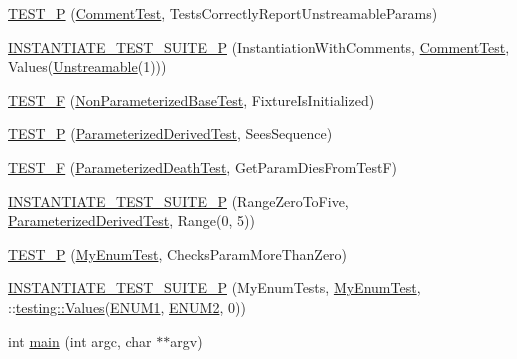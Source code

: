 \begin{DoxyCompactItemize}
\item 
\mbox{\hyperlink{googletest-master_2googletest_2test_2googletest-param-test-test_8cc_a5c5935ee04b0f74f29114ed7e1fa2315}{T\+E\+S\+T\+\_\+P}} (\mbox{\hyperlink{class_comment_test}{Comment\+Test}}, Tests\+Correctly\+Report\+Unstreamable\+Params)
\item 
\mbox{\hyperlink{googletest-master_2googletest_2test_2googletest-param-test-test_8cc_ab4ce7793d1d1d75035b8af30c3548a42}{I\+N\+S\+T\+A\+N\+T\+I\+A\+T\+E\+\_\+\+T\+E\+S\+T\+\_\+\+S\+U\+I\+T\+E\+\_\+P}} (Instantiation\+With\+Comments, \mbox{\hyperlink{class_comment_test}{Comment\+Test}}, Values(\mbox{\hyperlink{class_unstreamable}{Unstreamable}}(1)))
\item 
\mbox{\hyperlink{googletest-master_2googletest_2test_2googletest-param-test-test_8cc_af8865fa8411285bd2492b5105f35a7de}{T\+E\+S\+T\+\_\+F}} (\mbox{\hyperlink{class_non_parameterized_base_test}{Non\+Parameterized\+Base\+Test}}, Fixture\+Is\+Initialized)
\item 
\mbox{\hyperlink{googletest-master_2googletest_2test_2googletest-param-test-test_8cc_a92492aa8cc7fda6eb6438c6f7c74e478}{T\+E\+S\+T\+\_\+P}} (\mbox{\hyperlink{class_parameterized_derived_test}{Parameterized\+Derived\+Test}}, Sees\+Sequence)
\item 
\mbox{\hyperlink{googletest-master_2googletest_2test_2googletest-param-test-test_8cc_a0eb7e27c6505d446a1bc3e4fe856a6b2}{T\+E\+S\+T\+\_\+F}} (\mbox{\hyperlink{class_parameterized_death_test}{Parameterized\+Death\+Test}}, Get\+Param\+Dies\+From\+TestF)
\item 
\mbox{\hyperlink{googletest-master_2googletest_2test_2googletest-param-test-test_8cc_ae4ac2e7a7e07517b845246e2f16b6e76}{I\+N\+S\+T\+A\+N\+T\+I\+A\+T\+E\+\_\+\+T\+E\+S\+T\+\_\+\+S\+U\+I\+T\+E\+\_\+P}} (Range\+Zero\+To\+Five, \mbox{\hyperlink{class_parameterized_derived_test}{Parameterized\+Derived\+Test}}, Range(0, 5))
\item 
\mbox{\hyperlink{googletest-master_2googletest_2test_2googletest-param-test-test_8cc_af93c1bfa3f3b8f1670128c9afc5143b2}{T\+E\+S\+T\+\_\+P}} (\mbox{\hyperlink{class_my_enum_test}{My\+Enum\+Test}}, Checks\+Param\+More\+Than\+Zero)
\item 
\mbox{\hyperlink{googletest-master_2googletest_2test_2googletest-param-test-test_8cc_a6941458969980054942f74dd41cd731a}{I\+N\+S\+T\+A\+N\+T\+I\+A\+T\+E\+\_\+\+T\+E\+S\+T\+\_\+\+S\+U\+I\+T\+E\+\_\+P}} (My\+Enum\+Tests, \mbox{\hyperlink{class_my_enum_test}{My\+Enum\+Test}}, \+::\mbox{\hyperlink{namespacetesting_abd3c87b40c2a0663691c9b617ed5fcc2}{testing\+::\+Values}}(\mbox{\hyperlink{_obj__test_2lib_2googletest-master_2googletest_2test_2googletest-param-test-test_8cc_a057c666e39cf0735f5e7e74747124787ab4f50b5eb533127652f9dbca6bdf6c3d}{E\+N\+U\+M1}}, \mbox{\hyperlink{_obj__test_2lib_2googletest-master_2googletest_2test_2googletest-param-test-test_8cc_a057c666e39cf0735f5e7e74747124787ac3a9f8169cecee80b1d6d262cc1b83bd}{E\+N\+U\+M2}}, 0))
\item 
int \mbox{\hyperlink{googletest-master_2googletest_2test_2googletest-param-test-test_8cc_a3c04138a5bfe5d72780bb7e82a18e627}{main}} (int argc, char $\ast$$\ast$argv)
\end{DoxyCompactItemize}
